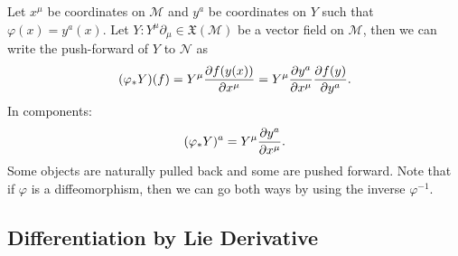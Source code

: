 Let $x^\mu$ be coordinates on $\mathcal{M}$ and $y^a$ be coordinates on $Y$ such that $\varphi(x) = y^a(x)$. Let $Y: Y^\mu \partial_\mu \in \mathfrak{X}(\mathcal{M})$ be a vector field on $\mathcal{M}$, then we can write the push-forward of $Y$ to $\mathcal{N}$ as 
\begin{equation}
  (\varphi_* Y) (f) = Y^\mu \pdv{f(y(x))}{x^\mu} = Y^\mu \pdv{y^a}{x^\mu} \pdv{f(y)}{y^a}.
\end{equation}
In components:
\begin{equation}
  \label{eq:push-forward-of-tangent-vector}
  (\varphi_* Y)^a = Y^\mu \pdv{y^a}{x^\mu}.
\end{equation}
Some objects are naturally pulled back and some are pushed forward. Note that if $\varphi$ is a diffeomorphism, then we can go both ways by using the inverse $\varphi^{-1}$.

\subsection{Differentiation by Lie Derivative}%
\label{sub:the_lie_derivative}

